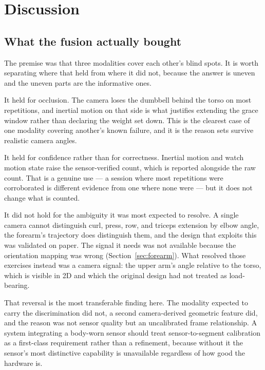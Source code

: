 \documentclass[11pt,a4paper]{article}
\begin{document}
\section{Discussion}
\label{sec:discussion}

\subsection{What the fusion actually bought}

The premise was that three modalities cover each other's blind spots. It is
worth separating where that held from where it did not, because the answer is
uneven and the uneven parts are the informative ones.

It held for occlusion. The camera loses the dumbbell behind the torso on most
repetitions, and inertial motion on that side is what justifies extending the
grace window rather than declaring the weight set down. This is the clearest
case of one modality covering another's known failure, and it is the reason
sets survive realistic camera angles.

It held for confidence rather than for correctness. Inertial motion and watch
motion state raise the sensor-verified count, which is reported alongside the
raw count. That is a genuine use --- a session where most repetitions were
corroborated is different evidence from one where none were --- but it does not
change what is counted.

It did not hold for the ambiguity it was most expected to resolve. A single
camera cannot distinguish curl, press, row, and triceps extension by elbow
angle, the forearm's trajectory does distinguish them, and the design that
exploits this was validated on paper. The signal it needs was not available
because the orientation mapping was wrong (Section~\ref{sec:forearm}). What
resolved those exercises instead was a camera signal: the upper arm's angle
relative to the torso, which is visible in 2D and which the original design had
not treated as load-bearing.

That reversal is the most transferable finding here. The modality expected to
carry the discrimination did not, a second camera-derived geometric feature
did, and the reason was not sensor quality but an uncalibrated frame
relationship. A system integrating a body-worn sensor should treat
sensor-to-segment calibration as a first-class requirement rather than a
refinement, because without it the sensor's most distinctive capability is
unavailable regardless of how good the hardware is.
\end{document}
